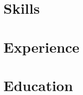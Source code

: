 \documentclass[a4paper,11pt]{article}
\begin{document}


\section{Skills}


\section{Experience}


\section{Education}

\end{document}
